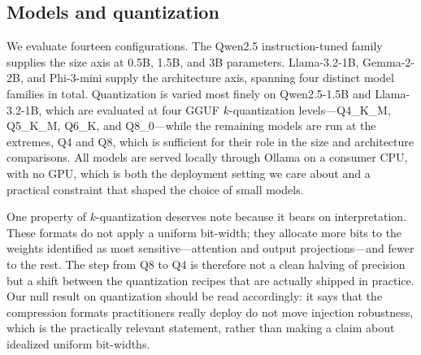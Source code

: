 \documentclass[11pt]{article}
\begin{document}
\subsection{Models and quantization}

We evaluate fourteen configurations. The Qwen2.5 instruction-tuned family
supplies the size axis at 0.5B, 1.5B, and 3B parameters. Llama-3.2-1B,
Gemma-2-2B, and Phi-3-mini supply the architecture axis, spanning four
distinct model families in total. Quantization is varied most finely on
Qwen2.5-1.5B and Llama-3.2-1B, which are evaluated at four GGUF
$k$-quantization levels---Q4\_K\_M, Q5\_K\_M, Q6\_K, and Q8\_0---while the
remaining models are run at the extremes, Q4 and Q8, which is sufficient
for their role in the size and architecture comparisons. All models are
served locally through Ollama on a consumer CPU, with no GPU, which is
both the deployment setting we care about and a practical constraint that
shaped the choice of small models.

One property of $k$-quantization deserves note because it bears on
interpretation. These formats do not apply a uniform bit-width; they
allocate more bits to the weights identified as most sensitive---attention
and output projections---and fewer to the rest. The step from Q8 to Q4 is
therefore not a clean halving of precision but a shift between the
quantization recipes that are actually shipped in practice. Our null
result on quantization should be read accordingly: it says that the
compression formats practitioners really deploy do not move injection
robustness, which is the practically relevant statement, rather than making
a claim about idealized uniform bit-widths.
\end{document}
